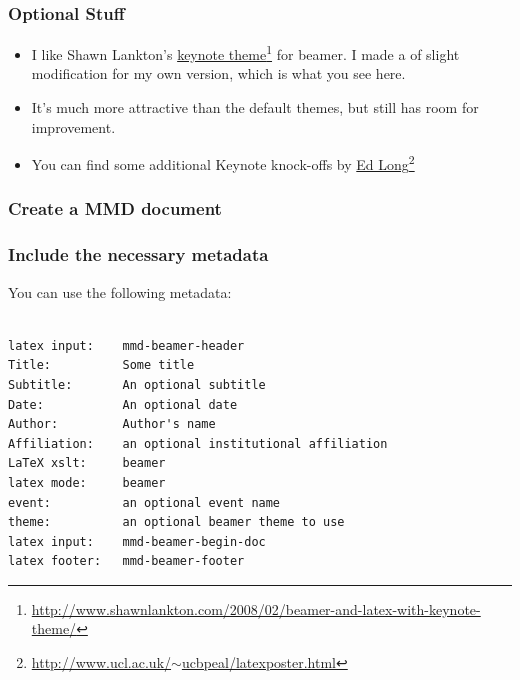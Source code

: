 \begin{frame}

\frametitle{Optional Stuff}
\label{optionalstuff}

\begin{itemize}
\item I like Shawn Lankton's \href{http://www.shawnlankton.com/2008/02/beamer-and-latex-with-keynote-theme/}{keynote theme}\footnote{\href{http://www.shawnlankton.com/2008/02/beamer-and-latex-with-keynote-theme/}{http:\slash \slash www.shawnlankton.com\slash 2008\slash 02\slash beamer-and-latex-with-keynote-theme\slash }}
 for beamer. I made a of slight modification for my own version, which is
 what you see here.

\item It's much more attractive than the default themes, but still has room for
 improvement.

\item You can find some additional Keynote knock-offs by \href{http://www.ucl.ac.uk/~ucbpeal/latexposter.html}{Ed Long}\footnote{\href{http://www.ucl.ac.uk/~ucbpeal/latexposter.html}{http:\slash \slash www.ucl.ac.uk\slash \ensuremath{\sim}ucbpeal\slash latexposter.html}}

\end{itemize}

\end{frame}

\begin{frame}

\frametitle{Create a MMD document}
\label{createammddocument}


\end{frame}

\begin{frame}[fragile]

\frametitle{Include the necessary metadata}
\label{includethenecessarymetadata}

You can use the following metadata:

\begin{verbatim}

latex input:    mmd-beamer-header
Title:          Some title
Subtitle:       An optional subtitle
Date:           An optional date
Author:         Author's name
Affiliation:    an optional institutional affiliation
LaTeX xslt:     beamer
latex mode:     beamer  
event:          an optional event name
theme:          an optional beamer theme to use
latex input:    mmd-beamer-begin-doc
latex footer:   mmd-beamer-footer

\end{verbatim}


\end{frame}

